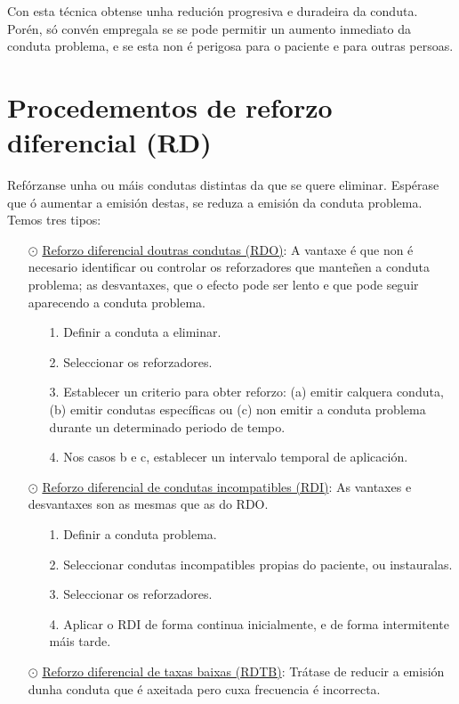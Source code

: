 \documentclass[a4paper,11pt]{article}
\begin{document}
Con esta técnica obtense unha redución progresiva e duradeira da conduta. Porén, só convén empregala se se pode permitir un aumento inmediato da conduta problema, e se esta non é perigosa para o paciente e para outras persoas. 

\section{Procedementos de reforzo diferencial (RD)}
Refórzanse unha ou máis condutas distintas da que se quere eliminar. Espérase que ó aumentar a emisión destas, se reduza a emisión da conduta problema. Temos tres tipos:
\begin{itemize}
	\item[$\odot$] \underline{Reforzo diferencial doutras condutas (RDO)}: A vantaxe é que non é 
	necesario identificar ou controlar os reforzadores que manteñen a conduta problema; as 
	desvantaxes, que o efecto pode ser lento e que pode seguir aparecendo a conduta problema.
	\begin{itemize}
		\item[1.] Definir a conduta a eliminar.
		\item[2.] Seleccionar os reforzadores.
		\item[3.] Establecer un criterio para obter reforzo: (a) emitir calquera conduta, (b) emitir 
		condutas específicas ou (c) non emitir a conduta problema durante un determinado periodo de 
		tempo.
		\item[4.] Nos casos b e c, establecer un intervalo temporal de aplicación.
	\end{itemize}
	\item[$\odot$] \underline{Reforzo diferencial de condutas incompatibles (RDI)}: As vantaxes e 
	desvantaxes son as mesmas que as do RDO.
	\begin{itemize}
		\item[1.] Definir a conduta problema.
		\item[2.] Seleccionar condutas incompatibles propias do paciente, ou instauralas.
		\item[3.] Seleccionar os reforzadores.
		\item[4.] Aplicar o RDI de forma continua inicialmente, e de forma intermitente máis tarde.
	\end{itemize}
	\item[$\odot$] \underline{Reforzo diferencial de taxas baixas (RDTB)}: Trátase de reducir a 
	emisión dunha conduta que é axeitada pero cuxa frecuencia é incorrecta. 
	\begin{itemize}

\end{itemize}
\end{itemize}
\end{document}
